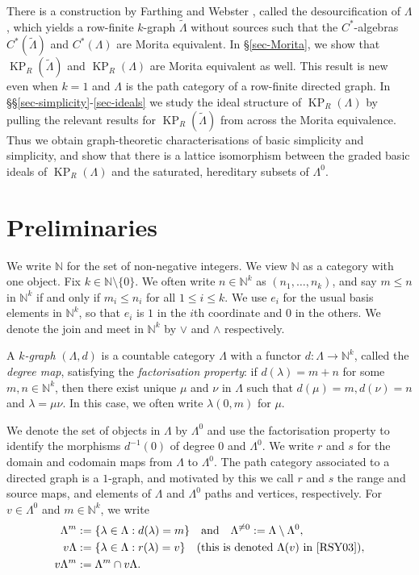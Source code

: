 \documentclass[a4paper,12pt]{amsart}
\numberwithin{equation}{section}
\theoremstyle{definition}
\theoremstyle{remark}
\begin{document}
There is a construction  by Farthing \cite{F} and Webster \cite{W}, called the desourcification of $\Lambda$,
 which yields a row-finite $k$-graph ${\tilde{\Lambda}}$ without sources such that the $C^*$-algebras $C^*({\tilde{\Lambda}})$ and $C^*(\Lambda)$
 are Morita equivalent.  In \S\ref{sec-Morita}, we show that $\operatorname{KP}_R({\tilde{\Lambda}})$ and $\operatorname{KP}_R(\Lambda)$ are Morita equivalent
 as well.  This result is new even when $k=1$ and  $\Lambda$ is the path category of a row-finite directed graph.  
In \S\S\ref{sec-simplicity}-\ref{sec-ideals} we  study the ideal structure of $\operatorname{KP}_R(\Lambda)$ by pulling the 
relevant results for $\operatorname{KP}_R({\tilde{\Lambda}})$ from \cite{ACaHR} across the Morita equivalence. Thus we obtain graph-theoretic 
characterisations of basic simplicity and simplicity, and show that there is a lattice isomorphism between the 
graded basic ideals of $\operatorname{KP}_R(\Lambda)$ and the saturated, hereditary subsets of $\Lambda^0$.

\section{Preliminaries}
We write ${\mathbb{N}}$ for the set of non-negative integers. We view ${\mathbb{N}}$ as a category with one object.  Fix $k\in {\mathbb{N}} \setminus \{0\}$.  
We often write $n \in {\mathbb{N}}^k$ as $(n_1, \dots, n_k)$, and say $m \leq n $ in ${\mathbb{N}}^k$ if and only if $m_i \leq n_i$ for
all $1\leq i \leq k$.   We use  $e_i$ for the usual basis elements in ${\mathbb{N}}^k$, so that $e_i$ is $1$ in the $i$th coordinate and $0$ in the others.  We denote the join and meet in ${\mathbb{N}}^k$ by $\vee$ and $\wedge$ respectively.

A \emph{$k$-graph} $(\Lambda, d)$  is a countable category $\Lambda$
with a functor $d: \Lambda \to {\mathbb{N}}^k$, called the \emph{degree map},  satisfying the \emph{factorisation property}:
if $d(\lambda) = m + n$ for some $m,n\in{\mathbb{N}}^k$, then there exist unique  $\mu$ and $\nu$ in $\Lambda$ such that
$d(\mu)=m, d(\nu)=n$ and $\lambda =\mu\nu$.  In this case, we often write $\lambda(0,m)$ for $\mu$. 

We denote the set of objects in $\Lambda$ by $\Lambda^0$ and use the factorisation property to identify  the morphisms $d^{-1}(0)$ of degree $0$ and  $\Lambda^0$.  We write $r$ and $s$  for the domain and codomain maps from $\Lambda$ to $\Lambda^0$.  
The path category associated to a directed graph is a $1$-graph, and motivated by this we call $r$ and $s$ the range and source maps, and elements of $\Lambda$ and $\Lambda^0$ paths and vertices, respectively.
For  $v \in \Lambda^0$ and $m \in {\mathbb{N}}^k$, we write 
\begin{align*}\Lambda^m &:= \{\lambda \in \Lambda : d(\lambda) = m\} \quad\text{and}\quad \Lambda^{\neq 0}:= \Lambda \setminus \Lambda^0,\\
 v \Lambda &:= \{\lambda \in \Lambda : r(\lambda) = v\} \quad\text{(this is denoted  $\Lambda(v)$ in \cite{RSY03})},\\
v \Lambda^m &:= \Lambda^m \cap v\Lambda.
\end{align*}
\end{document}
